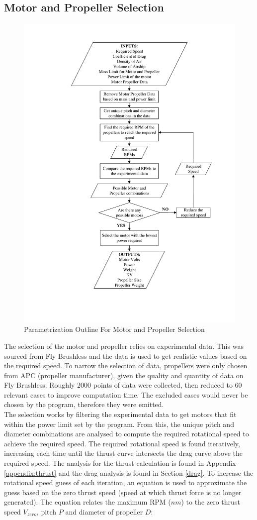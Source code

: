 \documentclass[../main.tex]{subfiles}
\begin{document}
\subsection{Motor and Propeller Selection} \label{motorSelect}

\begin{figure}[H]
	\centering
	\includegraphics[width=0.7\linewidth]{img/paramaterization/motorPropellerChoice.pdf}
	\caption{Parametrization Outline For Motor and Propeller Selection}
	\label{fig:motorOutline}
\end{figure}

The selection of the motor and propeller relies on experimental data. This was sourced from Fly Brushless \cite{motPropData} and the data is used to get realistic values based on the required speed. To narrow the selection of data, propellers were only chosen from APC (propeller manufacturer), given the quality and quantity of data on Fly Brushless. Roughly 2000 points of data were collected, then reduced to 60 relevant cases to improve computation time. The excluded cases would never be chosen by the program, therefore they were emitted.\\

The selection works by filtering the experimental data to get motors that fit within the power limit set by the program. From this, the unique pitch and diameter combinations are analysed to compute the required rotational speed to achieve the required speed. The required rotational speed is found iteratively, increasing each time until the thrust curve intersects the drag curve above the required speed. The analysis for the thrust calculation is found in Appendix \ref{appendix:thrust} and the drag analysis is found in Section \ref{drag}. To increase the rotational speed guess of each iteration, an equation is used to approximate the guess based on the zero thrust speed (speed at which thrust force is no longer generated). The equation relates the maximum RPM ($nm$) to the zero thrust speed $V_{zero}$, pitch $P$ and diameter of propeller $D$:
\end{document}
